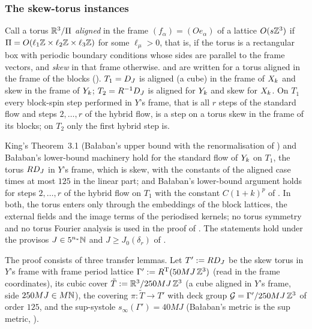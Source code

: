 
\subsubsection*{The skew-torus instances}

Call a torus $\mathbb R^3/\Pi$ \emph{aligned} in the frame $(f_\alpha)=(Oe_\alpha)$ of a lattice $O(s\mathbb Z^3)$ if $\Pi=O(\ell_1\mathbb Z\times\ell_2\mathbb Z\times\ell_3\mathbb Z)$ for some $\ell_\mu>0$, that is, if the torus is a rectangular box with periodic boundary conditions whose sides are parallel to the frame vectors, and \emph{skew} in that frame otherwise. \cite{Ba1,Ba2,Ba3} and \cite{K1} are written for a torus aligned in the frame of the blocks (\cite[(2.21)]{K1}). $T_1=D_J$ is aligned (a cube) in the frame of $X_k$ and skew in the frame of $Y_k$; $T_2=R^{-1}D_J$ is aligned for $Y_k$ and skew for $X_k$. On $T_1$ every block-spin step performed in $Y$'s frame, that is all $r$ steps of the standard flow and steps $2,\dots,r$ of the hybrid flow, is a step on a torus skew in the frame of its blocks; on $T_2$ only the first hybrid step is.

\begin{proposition}\label{rot:prop:SK}
King's Theorem~3.1 \cite[(3.4)]{K1} (Ba{\l}aban's upper bound with the renormalisation of \cite{Ba3}) and Ba{\l}aban's lower-bound machinery \cite[\S\S2--4, (1.14)]{Ba1} hold for the standard flow of $Y_k$ on $T_1$, the torus $RD_J$ in $Y$'s frame, which is skew, with the constants of the aligned case times at most $125$ in the linear part; and Ba{\l}aban's lower-bound argument holds for steps $2,\dots,r$ of the hybrid flow on $T_1$ with the constant $C(1+k)^p$ of . In both, the torus enters \cite{Ba1,Ba2,Ba3} only through the embeddings of the block lattices, the external fields and the image terms of the periodised kernels; no torus symmetry and no torus Fourier analysis is used in the proof of \cite[Prop.~1]{Ba3}. The statements hold under the provisos $J\in5^{n_*}\mathbb N$ and $J\ge J_0(\delta_r)$ of .
\end{proposition}

The proof consists of three transfer lemmas. Let $T':= RD_J$ be the skew torus in $Y$'s frame with frame period lattice $\Gamma':= R^{\mathrm T}(50MJ\,\mathbb Z^3)$ (read in the frame coordinates), its cubic cover $\tilde T:=\mathbb R^3/250MJ\,\mathbb Z^3$ (a cube aligned in $Y$'s frame, side $250MJ\in M\mathbb N$), the covering $\pi:\tilde T\to T'$ with deck group $\mathcal G=\Gamma'/250MJ\,\mathbb Z^3$ of order $125$, and the sup-systole $s_\infty(\Gamma')=40MJ$ (Ba{\l}aban's metric is the sup metric, \cite[p.~605]{Ba1}).

